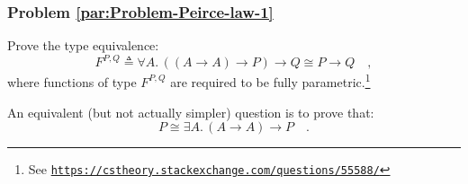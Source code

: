 \subsubsection{Problem \label{par:Problem-Peirce-law-1}\ref{par:Problem-Peirce-law-1}}

Prove the type equivalence:
\[
F^{P,Q}\triangleq\forall A.\,((A\rightarrow A)\rightarrow P)\rightarrow Q\cong P\rightarrow Q\quad,
\]
where functions of type $F^{P,Q}$ are required to be fully parametric.\footnote{See \texttt{\href{https://cstheory.stackexchange.com/questions/55588/}{https://cstheory.stackexchange.com/questions/55588/}}}

An equivalent (but not actually simpler) question is to prove that:
\[
P\cong\exists A.\,(A\rightarrow A)\rightarrow P\quad.
\]

